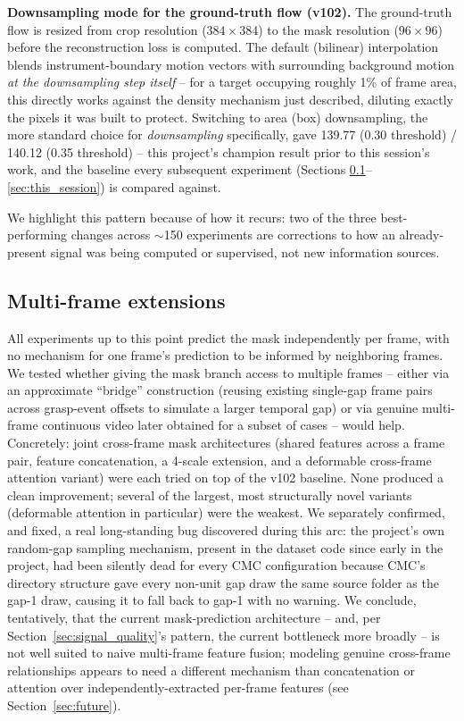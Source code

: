 \documentclass[conference]{IEEEtran}
\begin{document}
\textbf{Downsampling mode for the ground-truth flow (v102).} The
ground-truth flow is resized from crop resolution ($384\!\times\!384$) to
the mask resolution ($96\!\times\!96$) before the reconstruction loss is
computed. The default (bilinear) interpolation blends instrument-boundary
motion vectors with surrounding background motion \emph{at the
downsampling step itself} -- for a target occupying roughly 1\% of frame
area, this directly works against the density mechanism just described,
diluting exactly the pixels it was built to protect. Switching to area
(box) downsampling, the more standard choice for \emph{downsampling}
specifically, gave 139.77 (0.30 threshold) / 140.12 (0.35 threshold) --
this project's champion result prior to this session's work, and the
baseline every subsequent experiment (Sections
\ref{sec:multiframe}--\ref{sec:this_session}) is compared against.

We highlight this pattern because of how it recurs: two of the three
best-performing changes across $\sim$150 experiments are corrections to
how an already-present signal was being computed or supervised, not new
information sources.

\subsection{Multi-frame extensions}
\label{sec:multiframe}

All experiments up to this point predict the mask independently per
frame, with no mechanism for one frame's prediction to be informed by
neighboring frames. We tested whether giving the mask branch access to
multiple frames -- either via an approximate ``bridge'' construction
(reusing existing single-gap frame pairs across grasp-event offsets to
simulate a larger temporal gap) or via genuine multi-frame continuous
video later obtained for a subset of cases -- would help. Concretely:
joint cross-frame mask architectures (shared features across a frame
pair, feature concatenation, a 4-scale extension, and a deformable
cross-frame attention variant) were each tried on top of the v102
baseline. None produced a clean improvement; several of the largest,
most structurally novel variants (deformable attention in particular)
were the weakest. We separately confirmed, and fixed, a real
long-standing bug discovered during this arc: the project's own
random-gap sampling mechanism, present in the dataset code since early in
the project, had been silently dead for every CMC configuration because
CMC's directory structure gave every non-unit gap draw the same source
folder as the gap-1 draw, causing it to fall back to gap-1 with no
warning. We conclude, tentatively, that the current mask-prediction
architecture -- and, per Section~\ref{sec:signal_quality}'s pattern, the
current bottleneck more broadly -- is not well suited to naive multi-frame
feature fusion; modeling genuine cross-frame relationships appears to
need a different mechanism than concatenation or attention over
independently-extracted per-frame features (see Section~\ref{sec:future}).
\end{document}
